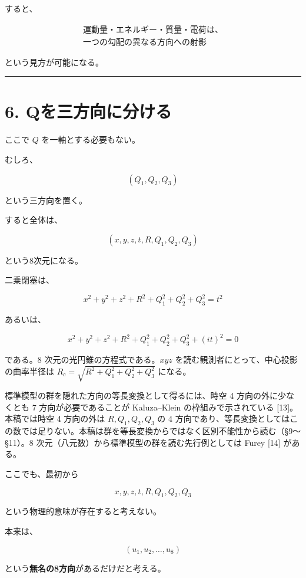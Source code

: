 \documentclass[
  a4paper,
]{ltjsarticle}
\begin{document}
すると、

\[
\boxed{
\begin{array}{c}
\text{運動量・エネルギー・質量・電荷は、}\\
\text{一つの勾配の異なる方向への射影}
\end{array}
}
\]

という見方が可能になる。

\begin{center}\rule{0.5\linewidth}{0.5pt}\end{center}

\section{6.
Qを三方向に分ける}\label{qux3092ux4e09ux65b9ux5411ux306bux5206ux3051ux308b}

ここで \(Q\) を一軸とする必要もない。

むしろ、

\[
(Q_1,Q_2,Q_3)
\]

という三方向を置く。

すると全体は、

\[
\boxed{
(x,y,z,t,R,Q_1,Q_2,Q_3)
}
\]

という8次元になる。

二乗閉塞は、

\[
\boxed{
x^2+y^2+z^2
+R^2+Q_1^2+Q_2^2+Q_3^2
=
t^2
}
\]

あるいは、

\[
\boxed{
x^2+y^2+z^2
+R^2+Q_1^2+Q_2^2+Q_3^2+(it)^2=0
}
\]

である。8 次元の光円錐の方程式である。\(xyz\)
を読む観測者にとって、中心投影の曲率半径は
\(R_c=\sqrt{R^2+Q_1^2+Q_2^2+Q_3^2}\) になる。

標準模型の群を隠れた方向の等長変換として得るには、時空 4
方向の外に少なくとも 7 方向が必要であることが Kaluza--Klein
の枠組みで示されている {[}13{]}。本稿では時空 4 方向の外は
\(R,Q_1,Q_2,Q_3\) の 4
方向であり、等長変換としてはこの数では足りない。本稿は群を等長変換からではなく区別不能性から読む（§9〜§11）。8
次元（八元数）から標準模型の群を読む先行例としては Furey {[}14{]}
がある。

ここでも、最初から

\[
x,y,z,t,R,Q_1,Q_2,Q_3
\]

という物理的意味が存在すると考えない。

本来は、

\[
(u_1,u_2,\ldots,u_8)
\]

という\textbf{無名の8方向}があるだけだと考える。
\end{document}
